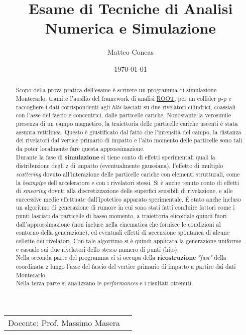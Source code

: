 \documentclass{article}
\title{Esame di Tecniche di Analisi Numerica e Simulazione} %
\author{Matteo Concas} %
\date{\today} %
\begin{document}
\maketitle %

\begin{center}
\begin{tabular}{l r}
Docente: Prof. Massimo Masera 
\end{tabular}
\end{center}

\begin{abstract}
Scopo della prova pratica dell'esame è scrivere un programma di simulazione Montecarlo, tramite l'ausilio del framework di analisi \href{http://root.cern.ch/drupal/}{ROOT},
per un collider p-p e raccogliere i dati corrispondenti agli \textit{hits} lasciati su due rivelatori cilindrici, coassiali con l'asse del fascio e concentrici, dalle particelle cariche.
Nonostante la verosimile presenza di un campo magnetico, la traiettoria delle particelle cariche uscenti è stata assunta rettilinea.
Questo è giustificato dal fatto che l'intensità del campo, la distanza dei rivelatori dal vertice primario di impatto e l'alto momento delle particelle sono tali da poter localmente fare questa approssimazione.\\
Durante la fase di \textbf{simulazione} si tiene conto di effetti sperimentali quali la distribuzione degli z di impatto (eventualmente gaussiana), l'effetto di multiplo \textit{scattering} dovuto all'interazione delle particelle cariche con elementi strutturali, come la \textit{beampipe} dell'acceleratore e con i rivelatori stessi. 
Si è anche tenuto conto di effetti di \textit{smearing} dovuti alla discretizzazione delle superfici sensibili di rivelazione, e alle successive medie effettuate dall'ipotetico apparato sperimentale.
\'E stato anche incluso un algoritmo di generazione di rumore in cui sono stati fatti confluire fattori come i punti lasciati da particelle di basso momento, a traiettoria elicoidale quindi fuori dall'approssimazione (non incluse nella cinematica che fornisce le condizioni al contorno della generazione), ed eventuali effetti di accensione spontanea di alcune cellette dei rivelatori. 
Con tale algoritmo si è quindi applicata la generazione uniforme e casuale sui due rivelatori dello stesso numero di punti (hits).\\ 
\indent Nella seconda parte del programma ci si occupa della \textbf{ricostruzione} \textit{"fast"} della coordinata z lungo l'asse del fascio del vertice primario di impatto a partire dai dati Montecarlo.\\
\indent Nella terza parte si analizzano le \textit{performances} e i risultati ottenuti.
\end{abstract}
\end{document}
